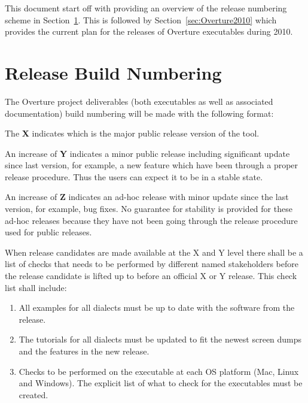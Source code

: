 \documentclass{overturerep}
\begin{document}
This document start off with providing an overview of the release
numbering scheme in Section~\ref{sec:numbering}. This is followed by
Section~\ref{sec:Overture2010} which provides the current plan for the
releases of Overture executables during 2010. 

\chapter{Release Build Numbering}\label{sec:numbering}

The Overture project deliverables (both executables as
well as associated documentation) build numbering will be made with
the following format:
\begin{center}
\end{center}

The \textbf{X} indicates which is the major public release version of
the tool. 

An increase of \textbf{Y} indicates a minor public release including
significant update since last version, for example, a new feature
which have been through a proper release procedure. Thus the users can
expect it to be in a stable state.

An increase of  \textbf{Z} indicates an ad-hoc release with minor
update since the last version, for example, bug fixes. No guarantee for
stability is provided for these ad-hoc releases because they have not
been going through the release procedure used for public releases.

When release candidates are made available at the X and Y level there
shall be a list of checks that needs to be performed by different
named stakeholders before the
release candidate is lifted up to before an official X or Y
release. This check list shall include:

\begin{enumerate}
\item All examples for all dialects must be up to date with the
  software from the release.
\item The tutorials for all dialects must be updated to fit the newest
  screen dumps and the features in the new release.
\item Checks to be performed on the executable at each OS platform
  (Mac, Linux and Windows). The explicit list of what to check for the
  executables must be created.
\end{enumerate}
\end{document}

